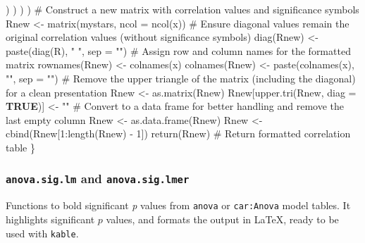 \documentclass[
  bookmarksnumbered]{article}
\newenvironment{Shaded}{\begin{snugshade}}{\end{snugshade}}
\newcommand{\AttributeTok}[1]{\textcolor[rgb]{0.80,0.80,0.80}{#1}}
\newcommand{\CommentTok}[1]{\textcolor[rgb]{0.50,0.62,0.50}{#1}}
\newcommand{\ConstantTok}[1]{\textcolor[rgb]{0.86,0.64,0.64}{\textbf{#1}}}
\newcommand{\DecValTok}[1]{\textcolor[rgb]{0.86,0.86,0.80}{#1}}
\newcommand{\FunctionTok}[1]{\textcolor[rgb]{0.94,0.94,0.56}{#1}}
\newcommand{\NormalTok}[1]{\textcolor[rgb]{0.80,0.80,0.80}{#1}}
\newcommand{\OtherTok}[1]{\textcolor[rgb]{0.94,0.94,0.56}{#1}}
\newcommand{\SpecialCharTok}[1]{\textcolor[rgb]{0.86,0.64,0.64}{#1}}
\newcommand{\StringTok}[1]{\textcolor[rgb]{0.80,0.58,0.58}{#1}}
\begin{document}
\begin{Shaded}
\begin{Highlighting}[]
\NormalTok{        )}
\NormalTok{      )}
\NormalTok{    )}
\NormalTok{  )}
  \CommentTok{\# Construct a new matrix with correlation values and significance symbols}
\NormalTok{  Rnew }\OtherTok{\textless{}{-}} \FunctionTok{matrix}\NormalTok{(mystars, }\AttributeTok{ncol =} \FunctionTok{ncol}\NormalTok{(x))}
  \CommentTok{\# Ensure diagonal values remain the original correlation values (without significance symbols)}
  \FunctionTok{diag}\NormalTok{(Rnew) }\OtherTok{\textless{}{-}} \FunctionTok{paste}\NormalTok{(}\FunctionTok{diag}\NormalTok{(R), }\StringTok{" "}\NormalTok{, }\AttributeTok{sep =} \StringTok{""}\NormalTok{)}
  \CommentTok{\# Assign row and column names for the formatted matrix}
  \FunctionTok{rownames}\NormalTok{(Rnew) }\OtherTok{\textless{}{-}} \FunctionTok{colnames}\NormalTok{(x)}
  \FunctionTok{colnames}\NormalTok{(Rnew) }\OtherTok{\textless{}{-}} \FunctionTok{paste}\NormalTok{(}\FunctionTok{colnames}\NormalTok{(x), }\StringTok{""}\NormalTok{, }\AttributeTok{sep =} \StringTok{""}\NormalTok{)}
  \CommentTok{\# Remove the upper triangle of the matrix (including the diagonal) for a clean presentation}
\NormalTok{  Rnew }\OtherTok{\textless{}{-}} \FunctionTok{as.matrix}\NormalTok{(Rnew)}
\NormalTok{  Rnew[}\FunctionTok{upper.tri}\NormalTok{(Rnew, }\AttributeTok{diag =} \ConstantTok{TRUE}\NormalTok{)] }\OtherTok{\textless{}{-}} \StringTok{""}
  \CommentTok{\# Convert to a data frame for better handling and remove the last empty column}
\NormalTok{  Rnew }\OtherTok{\textless{}{-}} \FunctionTok{as.data.frame}\NormalTok{(Rnew)}
\NormalTok{  Rnew }\OtherTok{\textless{}{-}} \FunctionTok{cbind}\NormalTok{(Rnew[}\DecValTok{1}\SpecialCharTok{:}\FunctionTok{length}\NormalTok{(Rnew) }\SpecialCharTok{{-}} \DecValTok{1}\NormalTok{])}
  \FunctionTok{return}\NormalTok{(Rnew) }\CommentTok{\# Return formatted correlation table}
\NormalTok{\}}
\end{Highlighting}
\end{Shaded}

\subsubsection{\texorpdfstring{\texttt{anova.sig.lm} and \texttt{anova.sig.lmer}}{anova.sig.lm and anova.sig.lmer}}\label{anova.sig.lm-and-anova.sig.lmer}

Functions to bold significant \emph{p} values from \texttt{anova} or \texttt{car:Anova} model tables. It highlights significant \(p\) values, and formats the output in \LaTeX, ready to be used with \texttt{kable}.
\end{document}
